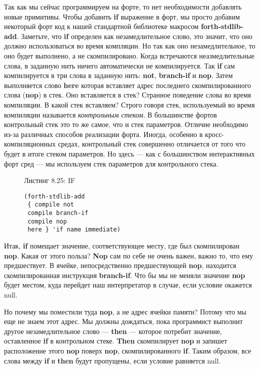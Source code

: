 Так как мы сейчас программируем на форте, то нет необходимости добавлять новые примитивы. Чтобы добавить \textbf{if} выражение в форт, мы просто добавим некоторый форт код к нашей стандартной библиотеке макросом \textbf{forth-stdlib-add}. Заметьте, что \textbf{if} определен как незамедлительное слово, это значит, что оно должно использоваться во время компляции. Но так как оно незамедлительное, то оно будет выполнено, а не скомпилировано. Когда встречаются неазмедлительные слова, в заданную нить ничего автоматически не компилируется. Так \textbf{if} сам компилируется в три слова в заданную нить: \textbf{not}, \textbf{branch-if} и \textbf{nop}. Затем выполняется слово \textbf{here} которая вставляет адрес последнего скомпилированного слова (\textbf{nop}) в стек. Оно вставляется в стек? Странное поведение слова во время компиляции. В какой стек вставляем? Строго говоря стек, используемый во время компиляции называется \emph{контрольным стеком}. В большинстве фортов контрольный стек это то же самое, что и стек параметров. Отличие необходимо из-за различных способов реализации форта. Иногда, особенно в кросс-компиляционных средах, контрольный стек совершенно отличается от того что будет в итоге стеком параметров. Но здесь --- как с большинством интерактивных форт сред --- мы используем стек параметров для контрольного стека.

\begin{figure}Листинг 8.25: IF\label{listing_8.25}
\listbegin
\begin{verbatim}
(forth-stdlib-add
 { compile not
 compile branch-if
 compile nop
 here } 'if name immediate)
\end{verbatim}
\listend
\end{figure}

Итак, \textbf{if} помещает значение, соответствующее месту, где был скомпилирован \textbf{nop}. Какая от этого польза? \textbf{Nop} сам по себе не очень важен, важно то, что ему предшествует. В ячейке, непосредственно предшествующей \textbf{nop}, находится скомпилированная инструкция \textbf{branch-if}. Что бы мы не меняли значение \textbf{nop} будет местом, куда перейдет наш интерпретатор в случае, если условие окажется null.

Но почему мы поместили туда \textbf{nop}, а не адрес ячейки памяти? Потому что мы еще не знаем этот адрес. Мы должны дождаться, пока программист выполнит другое незамедлительное слово --- \textbf{then} --- которое потребит значение, оставленное \textbf{if} в контрольном стеке. \textbf{Then} скомпилирует \textbf{nop} и запишет расположение этого \textbf{nop} поверх \textbf{nop}, скомпилированного \textbf{if}. Таким образом, все слова между \textbf{if} и \textbf{then} будут пропущены, если условие равняется null.

